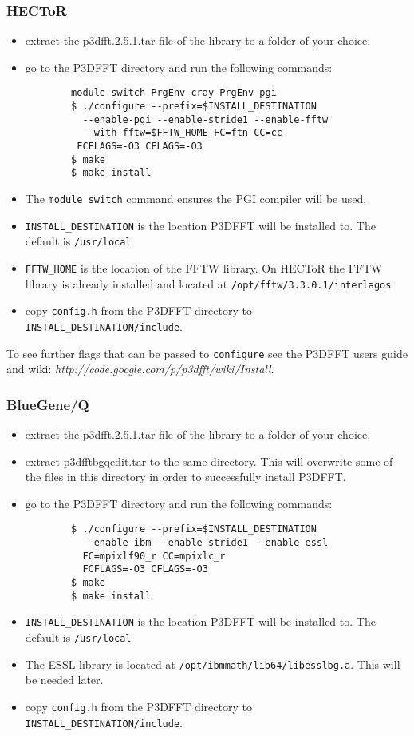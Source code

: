 \documentclass[12pt,a4paper]{article}
\begin{document}
\subsubsection{HECToR}
  \begin{itemize}
    \item extract the p3dfft.2.5.1.tar file of the library to a folder of your choice.
    \item go to the P3DFFT directory and run the following commands:
      \begin{verbatim}
        module switch PrgEnv-cray PrgEnv-pgi
        $ ./configure --prefix=$INSTALL_DESTINATION
          --enable-pgi --enable-stride1 --enable-fftw 
          --with-fftw=$FFTW_HOME FC=ftn CC=cc
         FCFLAGS=-O3 CFLAGS=-O3
        $ make
        $ make install
      \end{verbatim}
    \item The \texttt{module switch} command ensures the PGI compiler will be used.
    \item \texttt{INSTALL\_DESTINATION} is the location P3DFFT will be installed to. The default is \texttt{/usr/local}
    \item \texttt{FFTW\_HOME} is the location of the FFTW library. On HECToR the FFTW library is already installed and located at \texttt{/opt/fftw/3.3.0.1/interlagos}
    \item copy \texttt{config.h} from the P3DFFT directory to \texttt{INSTALL\_DESTINATION/include}.
  \end{itemize}

To see further flags that can be passed to \texttt{configure} see the P3DFFT users guide and wiki: \textit{http://code.google.com/p/p3dfft/wiki/Install}.

\subsubsection{BlueGene/Q}
  \begin{itemize}
    \item extract the p3dfft.2.5.1.tar file of the library to a folder of your choice.
    \item extract p3dfftbgqedit.tar to the same directory. This will overwrite some of the files in this directory in order to successfully install P3DFFT.
    \item go to the P3DFFT directory and run the following commands:
      \begin{verbatim}
        $ ./configure --prefix=$INSTALL_DESTINATION
          --enable-ibm --enable-stride1 --enable-essl 
          FC=mpixlf90_r CC=mpixlc_r
          FCFLAGS=-O3 CFLAGS=-O3
        $ make
        $ make install
      \end{verbatim}
    \item \texttt{INSTALL\_DESTINATION} is the location P3DFFT will be installed to. The default is \texttt{/usr/local}
    \item The ESSL library is located at \texttt{/opt/ibmmath/lib64/libesslbg.a}. This will be needed later.
    \item copy \texttt{config.h} from the P3DFFT directory to \texttt{INSTALL\_DESTINATION/include}.
  \end{itemize}
    
\end{document}
